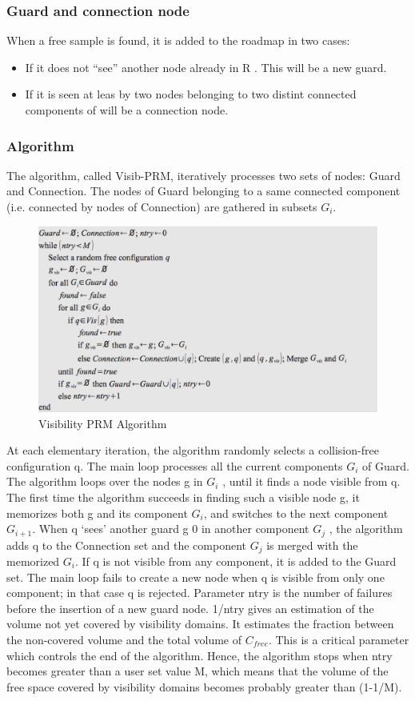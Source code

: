 \documentclass[11pt]{article}
\begin{document}
\subsubsection{Guard and connection node}
When a free sample is found, it is added to the roadmap in two cases:
\begin{itemize}
\item If it does not “see” another node already in R . This will be a new guard.
\item If it is seen at leas by two nodes belonging to two distint connected components of will be a connection node.
\end{itemize}
\subsubsection{Algorithm}
The algorithm, called Visib-PRM, iteratively processes two sets of nodes: Guard
and Connection. The nodes of Guard belonging to a same connected component
(i.e. connected by nodes of Connection) are gathered in subsets $G_i$.

\begin{figure}[h]
\includegraphics{visibility_psm_code}
\centering
\caption{Visibility PRM Algorithm}
\label{fig:vispsm_alg}
\end{figure}
At each elementary iteration, the algorithm randomly selects a collision-free
configuration q. The main loop processes all the current components $G_i$ of Guard. The algorithm loops over the nodes g in $G_i$ , until it finds a node visible from q. The
first time the algorithm succeeds in finding such a visible node g, it memorizes both
g and its component $G_i$, and switches to the next component $G_{i+1}$. When q ‘sees’
another guard g
0 in another component $G_j$ , the algorithm adds q to the Connection
set and the component $G_j$ is merged with the memorized $G_i$. If q is not visible from
any component, it is added to the Guard set. The main loop fails to create a new
node when q is visible from only one component; in that case q is rejected.
Parameter ntry is the number of failures before the insertion of a new guard node.
1/ntry gives an estimation of the volume not yet covered by visibility domains.
It estimates the fraction between the non-covered volume and the total volume of
$C_{free}$. This is a critical parameter which controls the end of the algorithm. Hence,
the algorithm stops when ntry becomes greater than a user set value M, which
means that the volume of the free space covered by visibility domains becomes
probably greater than (1-1/M).
\end{document}

